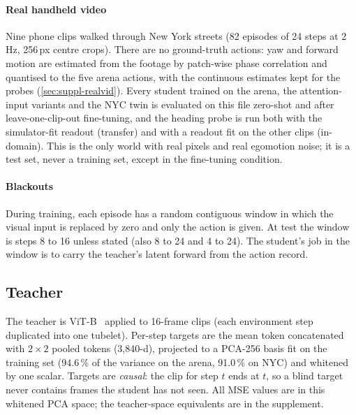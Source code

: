 \paragraph{Real handheld video} Nine phone clips walked through New York streets (82 episodes of 24 steps at 2\,Hz, 256\,px
centre crops). There are no ground-truth actions: yaw and forward motion are estimated from the footage by patch-wise
phase correlation and quantised to the five arena actions, with the continuous estimates kept for the probes
(\cref{sec:suppl-realvid}). Every student trained on the arena, the attention-input variants and the NYC twin is
evaluated on this file zero-shot and after leave-one-clip-out fine-tuning, and the heading probe is run both with the
simulator-fit readout (transfer) and with a readout fit on the other clips (in-domain). This is the only world with real
pixels and real egomotion noise; it is a test set, never a training set, except in the fine-tuning condition.

\paragraph{Blackouts} During training, each episode has a random contiguous window in which the visual input is
replaced by zero and only the action is given. At test the window is steps 8 to 16 unless stated (also 8 to 24 and 4 to
24). The student's job in the window is to carry the teacher's latent forward from the action record.

\subsection{Teacher}
The teacher is \vjepa ViT-B~\cite{assran2025vjepa2} applied to 16-frame clips (each environment step duplicated into one
tubelet). Per-step targets are the mean token concatenated with $2\times2$ pooled tokens (3,840-d), projected to a
PCA-256 basis fit on the training set (94.6\,\% of the variance on the arena, 91.0\,\% on NYC) and whitened by one
scalar. Targets are \emph{causal}: the clip for step $t$ ends at $t$, so a blind target never contains frames the student
has not seen. All MSE values are in this whitened PCA space; the teacher-space equivalents are in the supplement.

